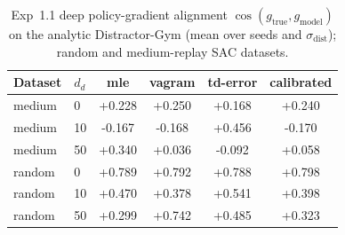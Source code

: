 \begin{table}[htbp]
\centering
\caption{Exp~1.1 deep policy-gradient alignment $\cos(g_{\text{true}}, g_{\text{model}})$ on the analytic Distractor-Gym (mean over seeds and $\sigma_{\text{dist}}$); random and medium-replay SAC datasets.}
\label{tab:h11}
\begin{tabular}{llcccc}
\toprule
Dataset & $d_d$ & mle & vagram & td-error & calibrated \\
\midrule
medium & 0 & +0.228 & +0.250 & +0.168 & +0.240 \\
medium & 10 & -0.167 & -0.168 & +0.456 & -0.170 \\
medium & 50 & +0.340 & +0.036 & -0.092 & +0.058 \\
random & 0 & +0.789 & +0.792 & +0.788 & +0.798 \\
random & 10 & +0.470 & +0.378 & +0.541 & +0.398 \\
random & 50 & +0.299 & +0.742 & +0.485 & +0.323 \\
\bottomrule
\end{tabular}
\end{table}
